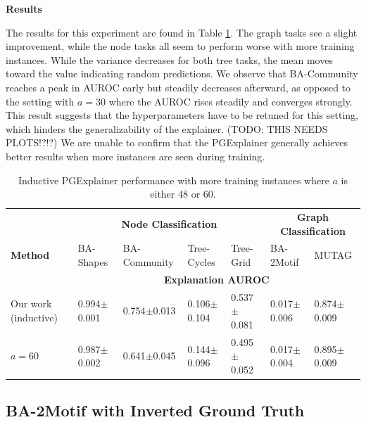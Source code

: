 \textbf{Results}\par
The results for this experiment are found in Table \ref{tab:experiment_60train}. The graph tasks see a slight improvement, while the node tasks all seem to perform worse with more training instances. While the variance decreases for both tree tasks, the mean moves toward the value indicating random predictions. We observe that BA-Community reaches a peak in AUROC early but steadily decreases afterward, as opposed to the setting with $a=30$ where the AUROC rises steadily and converges strongly. This result suggests that the hyperparameters have to be retuned for this setting, which hinders the generalizability of the explainer. (TODO: THIS NEEDS PLOTS!?!?) We are unable to confirm that the PGExplainer generally achieves better results when more instances are seen during training.

\begin{table}[ht]
    \centering
    \scriptsize
    \begin{tabularx}{\textwidth}{l|XXXX|XX}   %
    \textbf{} & \multicolumn{4}{c}{\textbf{Node Classification}} & \multicolumn{2}{c}{\textbf{Graph Classification}} \\
    \textbf{Method} & BA-Shapes & BA-Community & Tree-Cycles & Tree-Grid & BA-2Motif & MUTAG \\
    \midrule
    \addlinespace
    \textbf{} & \multicolumn{6}{c}{\textbf{Explanation AUROC}} \\
    \midrule
    Our work (inductive) & 0.994$\pm$0.001 & 0.754$\pm$0.013 & 0.106$\pm$0.104 & 0.537$\pm$0.081 & 0.017$\pm$0.006 & 0.874$\pm$0.009 \\
    \midrule
    $a=60$ & 0.987$\pm$0.002 & 0.641$\pm$0.045 & 0.144$\pm$0.096 & 0.495$\pm$0.052 & 0.017$\pm$0.004 & 0.895$\pm$0.009 \\
    \bottomrule
    \end{tabularx}
    \caption[Inductive performance with more training instances]{Inductive PGExplainer performance with more training instances where $a$ is either 48 or 60.}
    \label{tab:experiment_60train}
\end{table}

\subsection{BA-2Motif with Inverted Ground Truth}
\label{sec:flipped_gt}

